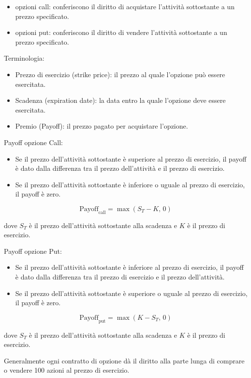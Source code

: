 \documentclass[12pt,a4paper]{report}
\begin{document}
\begin{itemize}
    \item opzioni call: conferiscono il diritto di acquistare l'attività sottostante a un prezzo specificato.
    \item opzioni put: conferiscono il diritto di vendere l'attività sottostante a un prezzo specificato.
\end{itemize}

Terminologia:
\begin{itemize}
    \item Prezzo di esercizio (strike price): il prezzo al quale l'opzione può essere esercitata.
    \item Scadenza (expiration date): la data entro la quale l'opzione deve essere esercitata.
    \item Premio (Payoff): il prezzo pagato per acquistare l'opzione.
\end{itemize}

Payoff opzione Call:
\begin{itemize}
    \item Se il prezzo dell'attività sottostante è superiore al prezzo di esercizio, il payoff è dato dalla differenza tra il prezzo dell'attività e il prezzo di esercizio.
    \item Se il prezzo dell'attività sottostante è inferiore o uguale al prezzo di esercizio, il payoff è zero.
\end{itemize}

\[
\mathrm{Payoff}_{\mathrm{call}} = \max(S_T - K,\, 0)
\]

dove \( S_T \) è il prezzo dell'attività sottostante alla scadenza e \( K \) è il prezzo di esercizio.

Payoff opzione Put:
\begin{itemize}
    \item Se il prezzo dell'attività sottostante è inferiore al prezzo di esercizio, il payoff è dato dalla differenza tra il prezzo di esercizio e il prezzo dell'attività.
    \item Se il prezzo dell'attività sottostante è superiore o uguale al prezzo di esercizio, il payoff è zero.
\end{itemize}

\[
\mathrm{Payoff}_{\mathrm{put}} = \max(K - S_T,\, 0)
\]

dove \( S_T \) è il prezzo dell'attività sottostante alla scadenza e \( K \) è il prezzo di esercizio.

Generalmente ogni contratto di opzione dà il diritto alla parte lunga di comprare o vendere 100 azioni al prezzo di esercizio.
\end{document}
